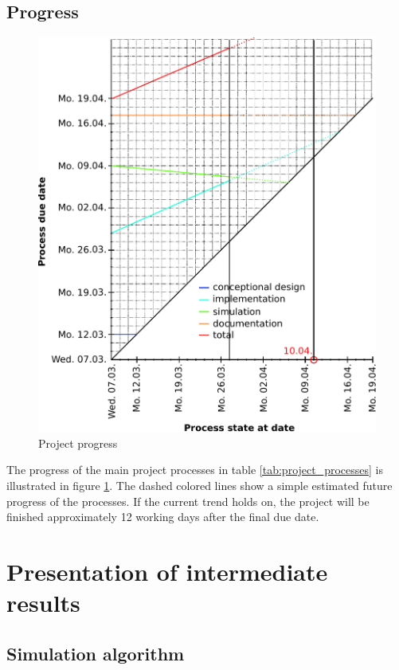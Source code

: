 \documentclass[a4paper,10pt]{article}
\begin{document}
\subsection{Progress}

\begin{figure}[h!]
 \centering
 \includegraphics[width=\linewidth]{progress.pdf}
 \caption{Project progress}
 \label{fig:project_progress}
\end{figure}

The progress of the main project processes in table \ref{tab:project_processes} is illustrated in figure \ref{fig:project_progress}. 
The dashed colored lines show a simple estimated future progress of the processes. If the current trend holds on, the project will be
finished approximately 12 working days after the final due date.


\newpage

\section{Presentation of intermediate results}
\subsection{Simulation algorithm}
\end{document}
